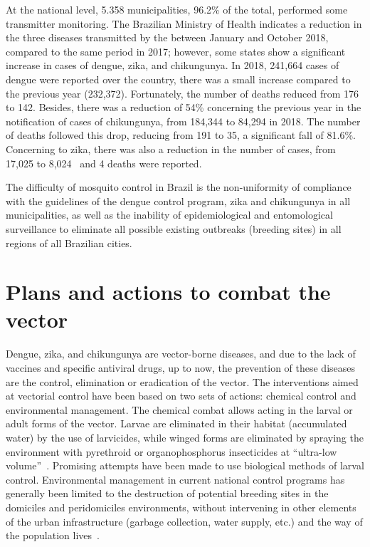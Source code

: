 At the national level, 5.358 municipalities, 96.2\% of the total, performed some transmitter monitoring.
The Brazilian Ministry of Health indicates a reduction in the three diseases transmitted by the \Aedes between January and October 2018, compared to the same period in 2017; however, some states show a significant increase in cases of dengue, zika, and chikungunya.
In 2018, 241,664 cases of dengue were reported over the country, there was a small increase compared to the previous year (232,372).
Fortunately, the number of deaths reduced from 176 to 142.
%
Besides, there was a reduction of 54\% concerning the previous year in the notification of cases of chikungunya, from 184,344 to 84,294 in 2018.
The number of deaths followed this drop, reducing from 191 to 35, a significant fall of 81.6\%.
%
Concerning to zika, there was also a reduction in the number of cases, from 17,025 to 8,024~\cite{web:brasil2018liraa} and 4 deaths were reported.

The difficulty of mosquito control in Brazil is the non-uniformity of compliance with the guidelines of the dengue control program, zika and chikungunya in all municipalities, as well as the inability of epidemiological and entomological surveillance to eliminate all possible existing outbreaks (breeding sites) in all regions of all Brazilian cities.

\section{Plans and actions to combat the vector}
%
Dengue, zika, and chikungunya are vector-borne diseases, and due to the lack of vaccines and specific antiviral drugs, up to now, the prevention of these diseases are the control, elimination or eradication of the vector.
%
%
The interventions aimed at vectorial control have been based on two sets of actions: chemical control and environmental management.
The chemical combat allows acting in the larval or adult forms of the vector.
Larvae are eliminated in their habitat (accumulated water) by the use of larvicides, while winged forms are eliminated by spraying the environment with pyrethroid or organophosphorus insecticides at “ultra-low volume”~\cite{araujo2015aedes}.
Promising attempts have been made to use biological methods of larval control.
Environmental management in current national control programs has generally been limited to the destruction of potential breeding sites in the domiciles and peridomiciles environments, without intervening in other elements of the urban infrastructure (garbage collection, water supply, etc.) and the way of the population lives~\cite{araujo2015aedes}.

